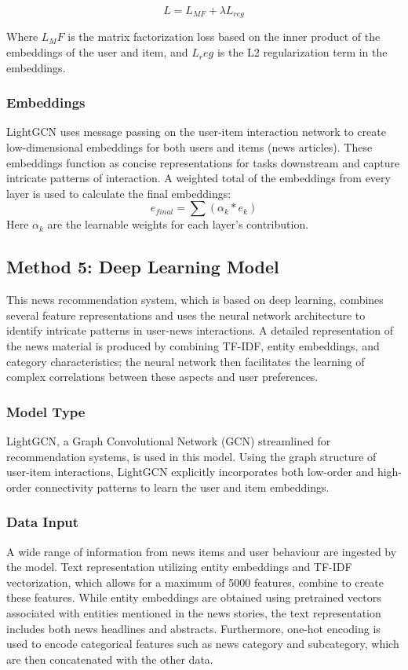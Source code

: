 \documentclass[9pt,twocolumn,twoside,lineno]{gsajnl}
\begin{document}
\[L = L_{MF} + \lambda L_{reg}\]

Where $L_MF$ is the matrix factorization loss based on the inner product of the embeddings of the user and item, and $L_reg$ is the L2 regularization term in the embeddings.

\subsubsection{Embeddings\newline}
LightGCN uses message passing on the user-item interaction network to create low-dimensional embeddings for both users and items (news articles). These embeddings function as concise representations for tasks downstream and capture intricate patterns of interaction. A weighted total of the embeddings from every layer is used to calculate the final embeddings:
\[e_{final} = \sum(\alpha_k * e_k)\]
Here $\alpha_k$ are the learnable weights for each layer's contribution.


\subsection{Method 5: Deep Learning Model}
This news recommendation system, which is based on deep learning, combines several feature representations and uses the neural network architecture to identify intricate patterns in user-news interactions. A detailed representation of the news material is produced by combining TF-IDF, entity embeddings, and category characteristics; the neural network then facilitates the learning of complex correlations between these aspects and user preferences.

\subsubsection{Model Type\newline}
LightGCN, a Graph Convolutional Network (GCN) streamlined for recommendation systems, is used in this model. Using the graph structure of user-item interactions, LightGCN explicitly incorporates both low-order and high-order connectivity patterns to learn the user and item embeddings.

\subsubsection{Data Input\newline}
A wide range of information from news items and user behaviour are ingested by the model. Text representation utilizing entity embeddings and TF-IDF vectorization, which allows for a maximum of 5000 features, combine to create these features. While entity embeddings are obtained using pretrained vectors associated with entities mentioned in the news stories, the text representation includes both news headlines and abstracts. Furthermore, one-hot encoding is used to encode categorical features such as news category and subcategory, which are then concatenated with the other data.
\end{document}
